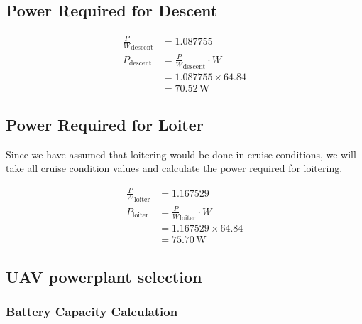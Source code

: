 \documentclass[12 pt]{article}
\begin{document}
\subsection {Power Required for Descent}

\begin{align*}
\frac{P}{W}_{\text{descent}} &= 1.087755 \\
P_{\text{descent}} &= \frac{P}{W}_{\text{descent}} \cdot W \\
&= 1.087755 \times 64.84 \\
&= 70.52 \, \text{W}
\end{align*}

\subsection {Power Required for Loiter}

Since we have assumed that loitering would be done in cruise conditions, we will take all cruise condition values and calculate the power required for loitering.

\begin{align*}
\frac{P}{W}_{\text{loiter}} &= 1.167529 \\
P_{\text{loiter}} &= \frac{P}{W}_{\text{loiter}} \cdot W \\
&= 1.167529 \times 64.84 \\
&= 75.70 \, \text{W}
\end{align*}







\subsection {UAV powerplant selection}

\subsubsection {Battery Capacity Calculation}
\end{document}
